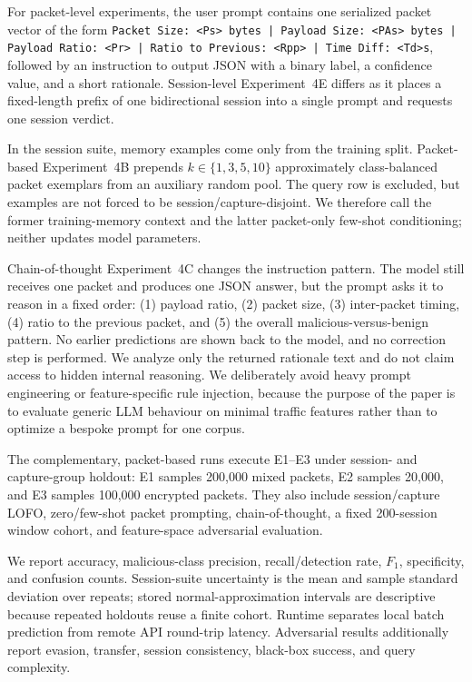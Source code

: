 \documentclass[letterpaper,twocolumn,10pt]{article}
\begin{document}
For packet-level experiments, the user prompt contains one serialized packet vector of the form \texttt{Packet Size: <Ps> bytes | Payload Size: <PAs> bytes | Payload Ratio: <Pr> | Ratio to Previous: <Rpp> | Time Diff: <Td>s}, followed by an instruction to output JSON with a binary label, a confidence value, and a short rationale. Session-level Experiment~4E differs as it places a fixed-length prefix of one bidirectional session into a single prompt and requests one session verdict. 

In the session suite, memory examples come only from the training split. Packet-based Experiment~4B prepends $k \in \{1,3,5,10\}$ approximately class-balanced packet exemplars from an auxiliary random pool. The query row is excluded, but examples are not forced to be session/capture-disjoint. We therefore call the former training-memory context and the latter packet-only few-shot conditioning; neither updates model parameters.

Chain-of-thought Experiment~4C changes the instruction pattern. The model still receives one packet and produces one JSON answer, but the prompt asks it to reason in a fixed order: (1) payload ratio, (2) packet size, (3) inter-packet timing, (4) ratio to the previous packet, and (5) the overall malicious-versus-benign pattern. No earlier predictions are shown back to the model, and no correction step is performed. We analyze only the returned rationale text and do not claim access to hidden internal reasoning. We deliberately avoid heavy prompt engineering or feature-specific rule injection, because the purpose of the paper is to evaluate generic LLM behaviour on minimal traffic features rather than to optimize a bespoke prompt for one corpus.

The complementary, packet-based runs execute E1--E3 under session- and capture-group holdout: E1 samples 200{,}000 mixed packets, E2 samples 20{,}000, and E3 samples 100{,}000 encrypted packets. They also include session/capture LOFO, zero/few-shot packet prompting, chain-of-thought, a fixed 200-session window cohort, and feature-space adversarial evaluation.

We report accuracy, malicious-class precision, recall/detection rate, $F_1$, specificity, and confusion counts. Session-suite uncertainty is the mean and sample standard deviation over repeats; stored normal-approximation intervals are descriptive because repeated holdouts reuse a finite cohort. Runtime separates local batch prediction from remote API round-trip latency. Adversarial results additionally report evasion, transfer, session consistency, black-box success, and query complexity.
\end{document}
